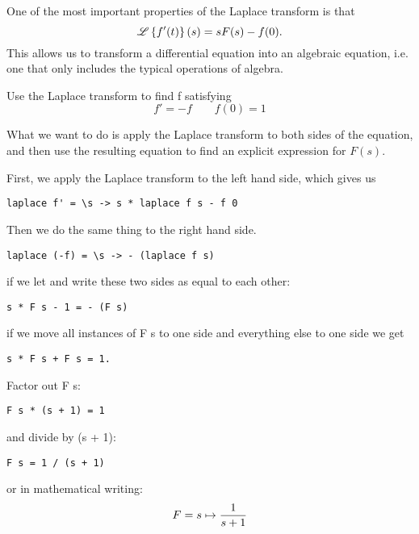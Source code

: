 One of the most important properties of the Laplace transform is that
\begin{equation*}
    \mathscr{L} \left\{ f'(t)\right\} (s) = s F(s) - f(0).
\end{equation*}
This allows us to transform a differential equation into an algebraic equation, i.e. one that only includes the typical operations of algebra.

\fi 

\begin{example}
Use the Laplace transform to find f satisfying 
\begin{equation*}
    f' = - f \qquad f(0) = 1
\end{equation*} 

\end{example}
\begin{solution}
What we want to do is apply the Laplace transform to both sides of the equation, and then use the resulting equation to find an explicit expression for $F(s)$. 

First, we apply the Laplace transform to the left hand side, which gives us 
\begin{verbatim} 
laplace f' = \s -> s * laplace f s - f 0 
\end{verbatim}

Then we do the same thing to the right hand side. 
\begin{verbatim}
laplace (-f) = \s -> - (laplace f s) 
\end{verbatim} 

if we let  and write these two sides as equal to each other: 


\begin{verbatim} 
s * F s - 1 = - (F s)
\end{verbatim} 

if we move all instances of F s to one side and everything else to one side we get

\begin{verbatim}
s * F s + F s = 1.
\end{verbatim}
Factor out F s:

\begin{verbatim}
F s * (s + 1) = 1
\end{verbatim} 
and divide by (s + 1):

\begin{verbatim}
F s = 1 / (s + 1)
\end{verbatim} 
or in mathematical writing: 
\begin{equation*} 
    F =  s \mapsto \frac{1}{s+1}
\end{equation*} 



\end{solution}
